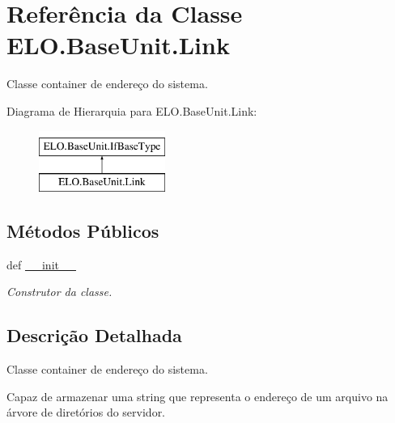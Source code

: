 \hypertarget{classELO_1_1BaseUnit_1_1Link}{\section{Referência da Classe E\-L\-O.\-Base\-Unit.\-Link}
\label{classELO_1_1BaseUnit_1_1Link}
}


Classe container de endereço do sistema.  


Diagrama de Hierarquia para E\-L\-O.\-Base\-Unit.\-Link\-:\begin{figure}[H]
\begin{center}
\leavevmode
\includegraphics[height=2.000000cm]{d9/dbc/classELO_1_1BaseUnit_1_1Link}
\end{center}
\end{figure}
\subsection*{Métodos Públicos}
\begin{DoxyCompactItemize}
\item 
def \hyperlink{classELO_1_1BaseUnit_1_1Link_a0c2308097022f21fc0ded45af15e9172}{\-\_\-\-\_\-init\-\_\-\-\_\-}
\begin{DoxyCompactList}\small\item\em Construtor da classe. \end{DoxyCompactList}\end{DoxyCompactItemize}


\subsection{Descrição Detalhada}
Classe container de endereço do sistema. 

Capaz de armazenar uma string que representa o endereço de um arquivo na árvore de diretórios do servidor. 

